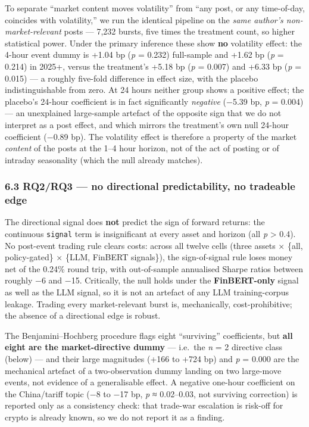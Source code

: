 \documentclass[
]{article}
\begin{document}
To separate ``market content moves volatility'' from ``any post, or any
time-of-day, coincides with volatility,'' we run the identical pipeline
on the \emph{same author's non-market-relevant} posts --- 7,232 bursts,
five times the treatment count, so higher statistical power. Under the
primary inference these show \textbf{no} volatility effect: the 4-hour
event dummy is +1.04 bp (\emph{p} = 0.232) full-sample and +1.62 bp
(\emph{p} = 0.214) in 2025+, versus the treatment's +5.18 bp (\emph{p} =
0.007) and +6.33 bp (\emph{p} = 0.015) --- a roughly five-fold
difference in effect size, with the placebo indistinguishable from zero.
At 24 hours neither group shows a positive effect; the placebo's 24-hour
coefficient is in fact significantly \emph{negative} (−5.39 bp, \emph{p}
= 0.004) --- an unexplained large-sample artefact of the opposite sign
that we do not interpret as a post effect, and which mirrors the
treatment's own null 24-hour coefficient (−0.89 bp). The volatility
effect is therefore a property of the market \emph{content} of the posts
at the 1--4 hour horizon, not of the act of posting or of intraday
seasonality (which the null already matches).

\subsubsection{6.3 RQ2/RQ3 --- no directional predictability, no
tradeable
edge}\label{rq2rq3-no-directional-predictability-no-tradeable-edge}

The directional signal does \textbf{not} predict the sign of forward
returns: the continuous \texttt{signal} term is insignificant at every
asset and horizon (all \emph{p} \textgreater{} 0.4). No post-event
trading rule clears costs: across all twelve cells (three assets ×
\{all, policy-gated\} × \{LLM, FinBERT signals\}), the sign-of-signal
rule loses money net of the 0.24\% round trip, with out-of-sample
annualised Sharpe ratios between roughly −6 and −15. Critically, the
null holds under the \textbf{FinBERT-only} signal as well as the LLM
signal, so it is not an artefact of any LLM training-corpus leakage.
Trading every market-relevant burst is, mechanically, cost-prohibitive;
the absence of a directional edge is robust.

The Benjamini--Hochberg procedure flags eight ``surviving''
coefficients, but \textbf{all eight are the market-directive dummy} ---
i.e.~the \emph{n} = 2 directive class (below) --- and their large
magnitudes (+166 to +724 bp) and \emph{p} = 0.000 are the mechanical
artefact of a two-observation dummy landing on two large-move events,
not evidence of a generalisable effect. A negative one-hour coefficient
on the China/tariff topic (−8 to −17 bp, \emph{p} ≈ 0.02--0.03, not
surviving correction) is reported only as a consistency check: that
trade-war escalation is risk-off for crypto is already known, so we do
not report it as a finding.
\end{document}
